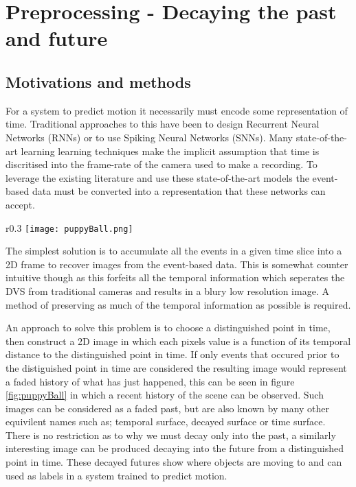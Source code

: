 \chapter{Preprocessing - Decaying the past and future}
\label{ch:preprocess}

\section{Motivations and methods}
For a system to predict motion it necessarily must encode some representation of time. 
Traditional approaches to this have been to design Recurrent Neural Networks (RNNs) or to use Spiking Neural Networks (SNNs). 
Many state-of-the-art learning learning techniques make the implicit assumption that time is discritised into the frame-rate of the camera used to make a recording. 
To leverage the existing literature and use these state-of-the-art models the event-based data must be converted into a representation that these networks can accept. 

\begin{wrapfigure}{r}{0.3\textwidth}
    \centering
    \label{fig:puppyBall}
    \texttt{[image: puppyBall.png]}
    \caption{A decayed image of a puppy with a ball}
\end{wrapfigure}
The simplest solution is to accumulate all the events in a given time slice into a 2D frame to recover images from the event-based data.
This is somewhat counter intuitive though as this forfeits all the temporal information which seperates the DVS from traditional cameras and results in a blury low resolution image. 
A method of preserving as much of the temporal information as possible is required. 


An approach to solve this problem is to choose a distinguished point in time, then construct a 2D image in which each pixels value is a function of its temporal distance to the distinguished point in time.
If only events that occured prior to the distiguished point in time are considered the resulting image would represent a faded history of what has just happened, this can be seen in figure \ref{fig:puppyBall} in which a recent history of the scene can be observed. 
Such images can be considered as a faded past, but are also known by many other equivilent names such as; temporal surface, decayed surface or time surface. 
There is no restriction as to why we must decay only into the past, a similarly interesting image can be produced decaying into the future from a distinguished point in time.
These decayed futures show where objects are moving to and can used as labels in a system trained to predict motion. 


